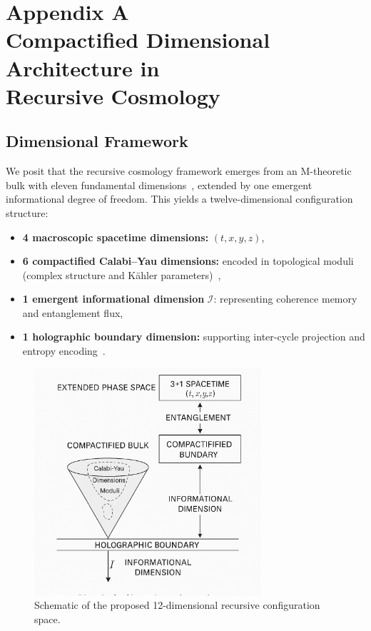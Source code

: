\section*{Appendix A\\Compactified Dimensional Architecture in\\Recursive Cosmology}
\label{appendix:A}

\subsection*{Dimensional Framework}

We posit that the recursive cosmology framework emerges from an M-theoretic bulk with eleven fundamental dimensions~\cite{witten1995string, becker2007string}, extended by one emergent informational degree of freedom. This yields a twelve-dimensional configuration structure:

\begin{itemize}
  \item \textbf{4 macroscopic spacetime dimensions:} \( (t, x, y, z) \),
  \item \textbf{6 compactified Calabi–Yau dimensions:} encoded in topological moduli (complex structure and Kähler parameters)~\cite{candelas1985vacuum},
  \item \textbf{1 emergent informational dimension} \( \mathcal{I} \): representing coherence memory and entanglement flux,
  \item \textbf{1 holographic boundary dimension:} supporting inter-cycle projection and entropy encoding~\cite{ryu2006holographic}.
\end{itemize}

\begin{figure}[H]
\centering
\includegraphics[width=0.75\textwidth]{figures/12D_structure_diagram.png}
\caption{Schematic of the proposed 12-dimensional recursive configuration space.}
\label{fig:12D_structure}
\end{figure}

